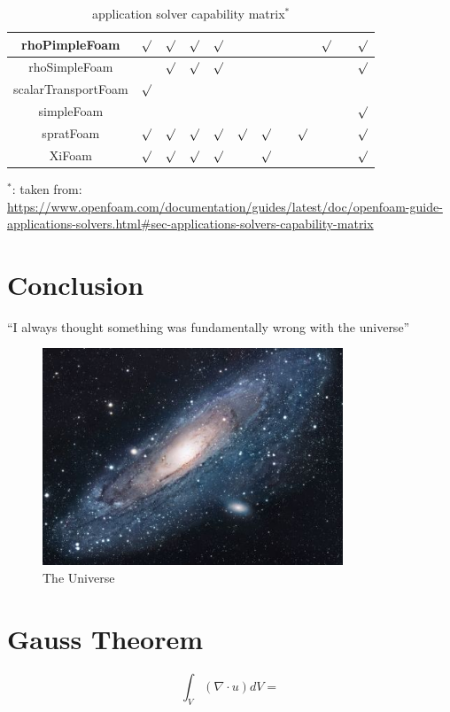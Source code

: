 \documentclass{article}
\begin{document}
\begin{landscape}
\begin{table}[h!]
\begin{tabular}{cccccccccccc}
\hline
rhoPimpleFoam & $\surd$ & $\surd$ & $\surd$ & $\surd$ & & & & & $\surd$ & & $\surd$ \\
\hline
rhoSimpleFoam & & $\surd$ & $\surd$ & $\surd$ & & & & & & &  $\surd$\\
\hline
scalarTransportFoam & $\surd$ & & & & & & & & & & \\
\hline
simpleFoam & & & & & & & & &  & & $\surd$ \\	
\hline
spratFoam & $\surd$ & $\surd$ & $\surd$ & $\surd$ & $\surd$ & $\surd$& & $\surd$ & & & $\surd$ \\
\hline
XiFoam & $\surd$ & $\surd$ & $\surd$ & $\surd$ & & $\surd$ & & & & & $\surd$\\
\hline
\end{tabular}
    \caption{application solver capability matrix$^*$}
    \label{tab:solver compatibility}
\end{table}
$^*$: taken from: 
\url{https://www.openfoam.com/documentation/guides/latest/doc/openfoam-guide-applications-solvers.html#sec-applications-solvers-capability-matrix}

\end{landscape}



\section{Conclusion}
``I always thought something was fundamentally wrong with the universe'' \citep{adams1995hitchhiker}
 
\begin{figure}[h!]
\centering
\includegraphics[width=0.8\textwidth,natwidth=610,natheight=642]{universe.jpg}
\caption{The Universe}
\label{fig:universe}
\end{figure}

\appendix
\section{Gauss Theorem}
\begin{equation}
\int_V(\nabla \cdot u) dV = 
\end{equation}



\end{document}
